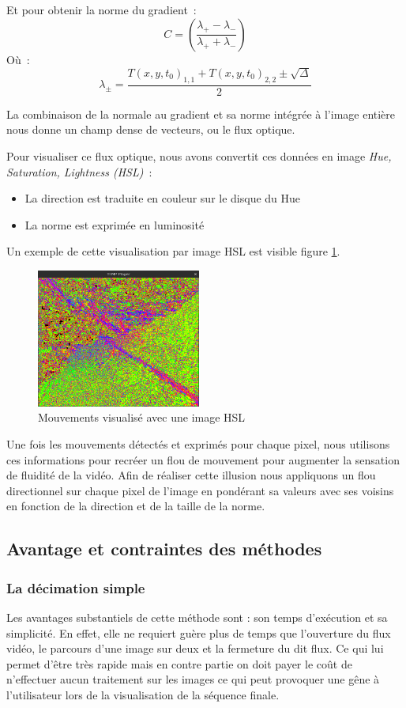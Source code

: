 \documentclass[fleqn,10pt]{SelfArx} %
\newcommand{\T}{T(x, y, t_{0})}
\begin{document}
Et pour obtenir la norme du gradient~:
\[
    C = \left(\frac{\lambda_{+} - \lambda_{-}}{\lambda_{+} + \lambda_{-}}\right)
\]
Où~:
\[
    \lambda_{\pm} = \frac{\T_{1,1} + \T_{2,2} \pm \sqrt{\Delta}}{2}
\]

La combinaison de la normale au gradient et sa norme intégrée à l'image entière nous donne un champ 
dense de vecteurs, ou le flux optique.

Pour visualiser ce flux optique, nous avons convertit ces données en image {\em Hue,
Saturation, Lightness (HSL)}~:
\begin{itemize}
    \item La direction est traduite en couleur sur le disque du Hue
    \item La norme est exprimée en luminosité
\end{itemize}

Un exemple de cette visualisation par image HSL est visible figure \ref{hsl}.
\begin{figure}[!ht]%
    \centering
    \includegraphics[width=0.48\textwidth]{img/hsl.png}
    \caption{Mouvements visualisé avec une image HSL}
    \label{hsl}
\end{figure}

Une fois les mouvements détectés et exprimés pour chaque pixel, nous utilisons ces informations pour recréer
un flou de mouvement pour augmenter la sensation de fluidité de la vidéo.
Afin de réaliser cette illusion nous appliquons un flou directionnel sur chaque pixel de l'image en pondérant
sa valeurs avec ses voisins en fonction de la direction et de la taille de la norme.

\subsection{Avantage et contraintes des méthodes}
\subsubsection{La décimation simple}
Les avantages substantiels de cette méthode sont : son temps d'exécution et sa simplicité. En effet, elle ne requiert guère plus de temps que l'ouverture du flux vidéo, le parcours d'une image sur deux et la fermeture du dit flux. Ce qui lui permet d'être très rapide mais en contre partie on doit payer le coût de n'effectuer aucun traitement sur les images ce qui peut provoquer une gêne à l'utilisateur lors de la visualisation de la séquence finale.
\end{document}
